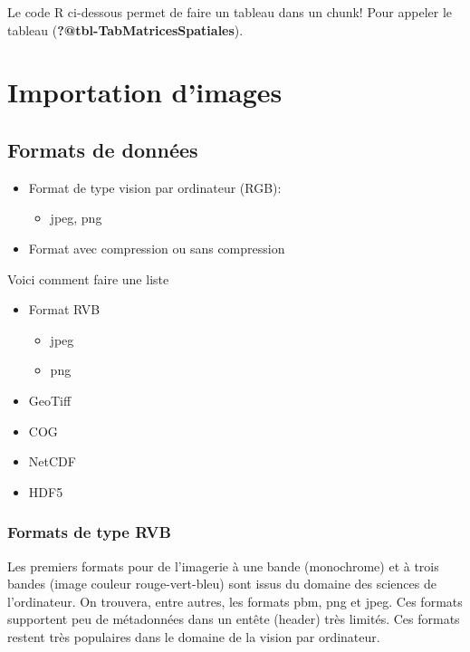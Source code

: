 \documentclass[
  letterpaper,
  DIV=11,
  numbers=noendperiod]{scrreprt}
\providecommand{\tightlist}{%
  \setlength{\itemsep}{0pt}\setlength{\parskip}{0pt}}\usepackage{longtable,booktabs,array}
\begin{document}
Le code R ci-dessous permet de faire un tableau dans un chunk! Pour
appeler le tableau (\textbf{?@tbl-TabMatricesSpatiales}).

\section{Importation d'images}\label{sec-011}

\subsection{Formats de données}\label{sec-0112}

\begin{itemize}
\tightlist
\item
  Format de type vision par ordinateur (RGB):

  \begin{itemize}
  \tightlist
  \item
    jpeg, png
  \end{itemize}
\item
  Format avec compression ou sans compression
\end{itemize}

Voici comment faire une liste

\begin{itemize}
\tightlist
\item
  Format RVB

  \begin{itemize}
  \tightlist
  \item
    jpeg
  \item
    png
  \end{itemize}
\item
  GeoTiff
\item
  COG
\item
  NetCDF
\item
  HDF5
\end{itemize}

\subsubsection{Formats de type RVB}\label{sec-01121}

Les premiers formats pour de l'imagerie à une bande (monochrome) et à
trois bandes (image couleur rouge-vert-bleu) sont issus du domaine des
sciences de l'ordinateur. On trouvera, entre autres, les formats pbm,
png et jpeg. Ces formats supportent peu de métadonnées dans un entête
(header) très limités. Ces formats restent très populaires dans le
domaine de la vision par ordinateur.
\end{document}
